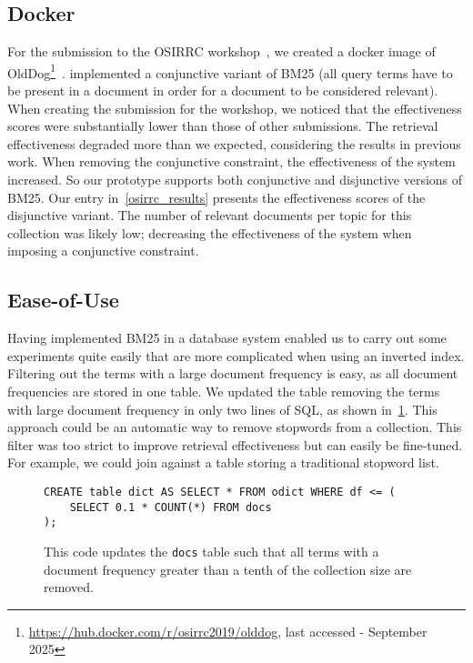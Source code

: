 \subsection{Docker}
For the submission to the OSIRRC workshop~\citep{OSIRRC}, we created a docker image of OldDog\footnote{\url{https://hub.docker.com/r/osirrc2019/olddog}, last accessed - September 2025}~\citep{olddog-docker}.  implemented a conjunctive variant of BM25 (all query terms have to be present in a document in order for a document to be considered relevant). When creating the submission for the workshop, we noticed that the effectiveness scores were substantially lower than those of other submissions. The retrieval effectiveness degraded more than we expected, considering the results in previous work. When removing the conjunctive constraint, the effectiveness of the system increased. So our prototype supports both conjunctive and disjunctive versions of BM25. Our entry in~\cref{osirrc_results} presents the effectiveness scores of the disjunctive variant. The number of relevant documents per topic for this collection was likely low; decreasing the effectiveness of the system when imposing a conjunctive constraint.

\subsection{Ease-of-Use}
Having implemented BM25 in a database system enabled us to carry out some experiments quite easily that are more complicated when using an inverted index. Filtering out the terms with a large document frequency is easy, as all document frequencies are stored in one table. We updated the table removing the terms with large document frequency in only two lines of SQL, as shown in~\cref{fig:remove-high-df}. This approach could be an automatic way to remove stopwords from a collection. This filter was too strict to improve retrieval effectiveness but can easily be fine-tuned. For example, we could join against a table storing a traditional stopword list. 

\begin{figure}
	\begin{verbatim}
CREATE table dict AS SELECT * FROM odict WHERE df <= (
	SELECT 0.1 * COUNT(*) FROM docs
);		
	\end{verbatim}
	\caption{This code updates the \texttt{docs} table such that all terms with a document frequency greater than a tenth of the collection size are removed.}
	\label{fig:remove-high-df}
\end{figure}

